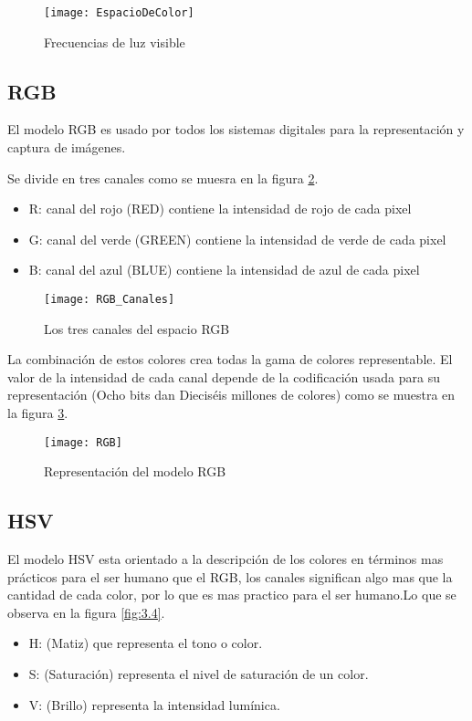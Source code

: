\begin{figure}[h]
\centering
\texttt{[image: EspacioDeColor]}
\caption{Frecuencias de luz visible \cite{Manual:HAE}}
\label{fig:3.1}
\end{figure}

\subsection{RGB}
El modelo RGB es usado por todos los sistemas digitales para la representación y captura de imágenes.

Se divide en tres canales como se muesra en la figura \ref{fig:3.2}.

\begin{itemize}
	\item R: canal del rojo (RED) contiene la intensidad de rojo de cada pixel
	\item G: canal del verde (GREEN) contiene la intensidad de verde de cada pixel
	\item B: canal del azul (BLUE) contiene la intensidad de azul de cada pixel
\end{itemize}

\begin{figure}[h]
\centering
\texttt{[image: RGB\_Canales]}
\caption{Los tres canales del espacio RGB \cite{Manual:HAE}}
\label{fig:3.2}
\end{figure}
La combinación de estos colores crea todas la gama de colores representable.
El valor de la intensidad de cada canal depende de la codificación usada para su representación (Ocho bits dan Dieciséis millones de colores) como se muestra en la figura  \ref{fig:3.3}.

\begin{figure}[h]
\centering
\texttt{[image: RGB]}
\caption{Representación del modelo RGB\cite{Manual:HAE}}
\label{fig:3.3}
\end{figure}

\subsection{HSV}
El modelo HSV \cite{modelo:hsv} esta orientado a la descripción de los colores en términos mas prácticos para el ser humano que el RGB, los canales significan algo mas que la cantidad de cada color, por lo que es mas practico para el ser humano.Lo que se observa en la figura \ref{fig:3.4}.
 
\begin{itemize}
	\item H: (Matiz) que representa el tono o color.\\
	\item S: (Saturación) representa el nivel de saturación de un color.\\
	\item V: (Brillo) representa la intensidad lumínica.\\
\end{itemize}

